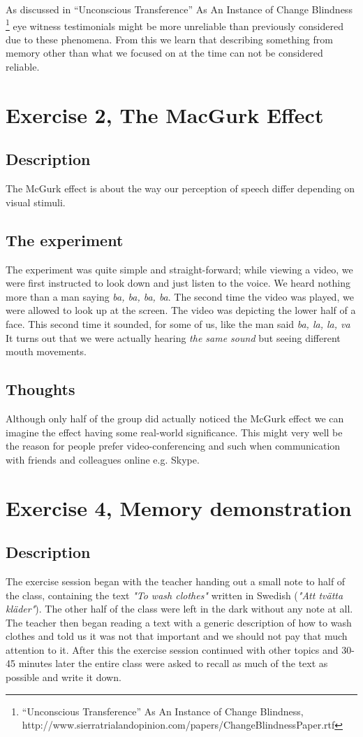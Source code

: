 \documentclass[10pt, a4paper]{article}
\begin{document}
As discussed in “Unconscious Transference” As An Instance of Change Blindness \footnote{“Unconscious Transference” As An Instance of Change Blindness, http://www.sierratrialandopinion.com/papers/ChangeBlindnessPaper.rtf} eye witness testimonials might be more unreliable than previously considered due to these phenomena. From this we learn that describing something from memory other than what we focused on at the time can not be considered reliable. 


\section{Exercise 2, The MacGurk Effect}
\subsection{Description}
The McGurk effect is about the way our perception of speech differ depending on visual stimuli.

\subsection{The experiment}
The experiment was quite simple and straight-forward; while viewing a video, we were first instructed to look down and just listen to the voice. We heard nothing more than a man saying \emph{ba, ba, ba, ba}. The second time the video was played, we were allowed to look up at the screen. The video was depicting the lower half of a face.  This second time it sounded, for some of us, like the man said \emph{ba, la, la, va} It turns out that we were actually hearing \emph{the same sound} but seeing different mouth movements.

\subsection{Thoughts}
Although only half of the group did actually noticed the McGurk effect we can imagine the effect having some real-world significance. This might very well be the reason for people prefer video-conferencing and such when communication with friends and colleagues online e.g. Skype.

\section{Exercise 4, Memory demonstration}
\subsection{Description}
The exercise session began with the teacher handing out a small note to half of the class, containing the text \emph{"To wash clothes"} written in Swedish (\emph{"Att tvätta kläder"}). The other half of the class were left in the dark without any note at all. The teacher then began reading a text with a generic description of how to wash clothes and told us it was not that important and we should not pay that much attention to it. After this the exercise session continued with other topics and 30-45 minutes later the entire class were asked to recall as much of the text as possible and write it down.
\end{document}

